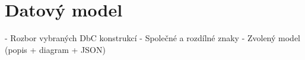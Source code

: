 \chapter{Datový model}
 - Rozbor vybraných DbC konstrukcí
 - Společné a rozdílné znaky
 - Zvolený model (popis + diagram + JSON)